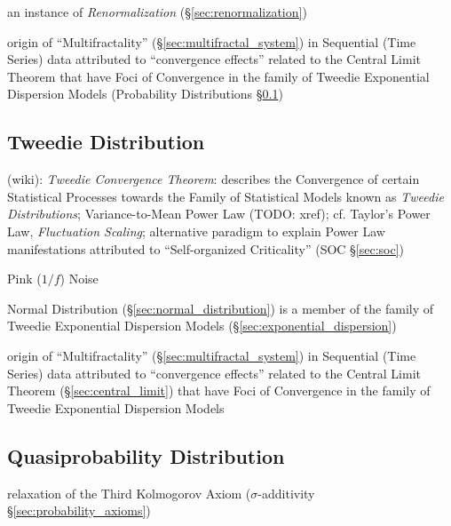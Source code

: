 \fist an instance of \emph{Renormalization} (\S\ref{sec:renormalization})

\fist origin of ``Multifractality'' (\S\ref{sec:multifractal_system}) in
Sequential (Time Series) data attributed to ``convergence effects'' related to
the Central Limit Theorem that have Foci of Convergence in the family of Tweedie
Exponential Dispersion Models (Probability Distributions
\S\ref{sec:tweedie_distribution})



\subsection{Tweedie Distribution}\label{sec:tweedie_distribution}

(wiki): \emph{Tweedie Convergence Theorem}: describes the Convergence of certain
Statistical Processes towards the Family of Statistical Models known as
\emph{Tweedie Distributions}; Variance-to-Mean Power Law (TODO: xref); cf.
Taylor's Power Law, \emph{Fluctuation Scaling}; alternative paradigm to explain
Power Law manifestations attributed to ``Self-organized Criticality''
(SOC \S\ref{sec:soc})

Pink ($1/f$) Noise

Normal Distribution (\S\ref{sec:normal_distribution}) is a member of the family
of Tweedie Exponential Dispersion Models (\S\ref{sec:exponential_dispersion})

\fist origin of ``Multifractality'' (\S\ref{sec:multifractal_system}) in
Sequential (Time Series) data attributed to ``convergence effects'' related to
the Central Limit Theorem (\S\ref{sec:central_limit}) that have Foci of
Convergence in the family of Tweedie Exponential Dispersion Models



\subsection{Quasiprobability Distribution}
\label{sec:quasiprobability_distribution}

relaxation of the Third Kolmogorov Axiom ($\sigma$-additivity
\S\ref{sec:probability_axioms})

